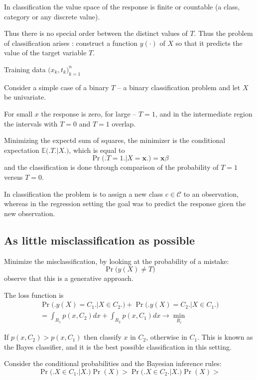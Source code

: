 \documentclass[a4paper]{article}
\newcommand{\Ccal}{\mathcal{C}}
\newcommand{\Ex}[0]{{\mathbb{E}}}
\begin{document}
In classification the value space of the response is finite or countable (a class, category or any discrete value).

Thus there is no special order between the distinct values of $T$. 
Thus the problem of classification arises :
construct a function $y(\cdot)$ of $X$ so that it predicts the value of the target variable $T$.

Training data $\big(x_k, t_k\big)_{k=1}^n$ 

Consider a simple case of a binary $T$ -- a binary classification problem and let $X$ be univariate.

For small $x$ the response is zero, for large -- $T=1$, and in the intermediate region the intervals with $T=0$ and $T=1$ overlap.

Minimizing the expectd sum of squares, the minimizer is the conditional expectation $\Ex\big(\big. T\big.\big\rvert X\big.\big)$, which is equal to 
\[\Pr\big(\big. T = 1\big.\big\rvert X = \mathbf{x}\big.\big) = \mathbf{x}\beta\]
and the classification is done through comparison of the probability of $T=1$ versus $T=0$.

In classification the problem is to assign a new class $c\in \Ccal$ to an observation, whereas in the regression setting the goal was to predict the response gicen the new observation.

\subsection{As little misclassification as possible} %
\label{sub:as_little_misclassification_as_possible}

Minimize the misclassification, by looking at the probability of a mistake:
\[\Pr\big(y(X)\neq T\big)\]
observe that this is a generative approach.

The loss function is
\begin{multline*}
	\Pr\big(\big. y(X) = C_1\big.\big\rvert X\in C_2\big.\big) + \Pr\big(\big. y(X) = C_2\big.\big\rvert X\in C_1\big.\big)\\
	= \int_{R_1} p(x, C_2) dx + \int_{R_2} p(x, C_1) dx \to \min_{R_i}
\end{multline*}

If $p(x, C_2) > p(x, C_1)$ then classify $x$ in $C_2$, otherwise in $C_1$.
This is known as the Bayes classifier, and it is the best possible classification in this setting.

Consider the conditional probabilities and the Bayesian inference rules:
\[\Pr\big(\big. X\in C_1\big.\big\rvert X\big.\big) \Pr( X ) > \Pr\big(\big. X\in C_2\big.\big\rvert X\big.\big) \Pr( X ) > \]
\end{document}
